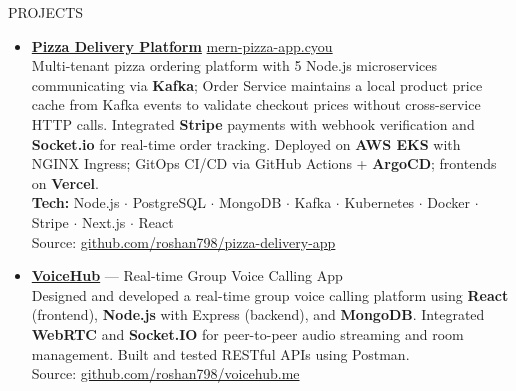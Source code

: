 \documentclass{resume} %
\begin{document}
\begin{rSection}{PROJECTS}
\begin{itemize}
\item \href{https://github.com/roshan798/pizza-delivery-app}{\textbf{Pizza Delivery Platform}}
  \hfill \href{https://mern-pizza-app.cyou}{mern-pizza-app.cyou}\\
  Multi-tenant pizza ordering platform with 5 Node.js microservices communicating
  via \textbf{Kafka}; Order Service maintains a local product price cache from
  Kafka events to validate checkout prices without cross-service HTTP calls.
  Integrated \textbf{Stripe} payments with webhook verification and
  \textbf{Socket.io} for real-time order tracking.
  Deployed on \textbf{AWS EKS} with NGINX Ingress; GitOps CI/CD via
  GitHub Actions + \textbf{ArgoCD}; frontends on \textbf{Vercel}.\\
  \textbf{Tech:} Node.js $\cdot$ PostgreSQL $\cdot$ MongoDB $\cdot$ Kafka
  $\cdot$ Kubernetes $\cdot$ Docker $\cdot$ Stripe $\cdot$ Next.js $\cdot$ React\\
  Source: \href{https://github.com/roshan798/pizza-delivery-app}{github.com/roshan798/pizza-delivery-app}



\item \href{https://github.com/roshan798/voicehub.me}{\textbf{VoiceHub}}
  --- Real-time Group Voice Calling App\\
  Designed and developed a real-time group voice calling platform using
  \textbf{React} (frontend), \textbf{Node.js} with Express (backend), and
  \textbf{MongoDB}. Integrated \textbf{WebRTC} and \textbf{Socket.IO} for
  peer-to-peer audio streaming and room management. Built and tested RESTful
  APIs using Postman.\\
  Source: \href{https://github.com/roshan798/voicehub.me}{github.com/roshan798/voicehub.me}




\end{itemize}
\end{rSection}
\end{document}
